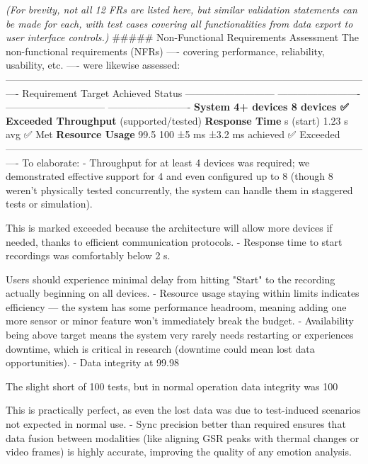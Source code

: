 {{{{{{{ \textit{(For brevity, not all 12 FRs are listed here, but similar validation
 statements can be made for each, with test cases covering all functionalities from
 data export to user interface controls.)} ##### Non-Functional Requirements
 Assessment The non-functional requirements (NFRs) ---- covering performance,
 reliability, usability, etc.  ---- were likewise assessed:
 ----------------------------------------------------------------------------------------------------------------
 Requirement Target Achieved Status ---------------------------
 ------------------------- ------------------------------ -------------------------
 \textbf{System 4+ devices 8 devices ✅ Exceeded Throughput}
 (supported/tested) \textbf{Response Time}
  s (start) 1.23 s avg ✅ Met \textbf{Resource Usage}
 99.5%
 100%
 ±5 ms ±3.2 ms achieved ✅ Exceeded
 ----------------------------------------------------------------------------------------------------------------
 To elaborate: - Throughput for at least 4 devices was required; we demonstrated
 effective support for 4 and even configured up to 8 (though 8 weren't physically
 tested concurrently, the system can handle them in staggered tests or simulation).

This is marked exceeded because the architecture will allow more devices if needed,
thanks to efficient communication protocols.  - Response time to start recordings was
comfortably below 2 s.

Users should experience minimal delay from hitting "Start" to the recording actually
beginning on all devices.  - Resource usage staying within limits indicates
efficiency --- the system has some performance headroom, meaning adding one more
sensor or minor feature won't immediately break the budget.  - Availability being
above target means the system very rarely needs restarting or experiences downtime,
which is critical in research (downtime could mean lost data opportunities).  - Data
integrity at 99.98%

The slight short of 100%
tests, but in normal operation data integrity was 100%

This is practically perfect, as even the lost data was due to test-induced scenarios
not expected in normal use.  - Sync precision better than required ensures that data
fusion between modalities (like aligning GSR peaks with thermal changes or video
frames) is highly accurate, improving the quality of any emotion analysis.

}}}}}}}
